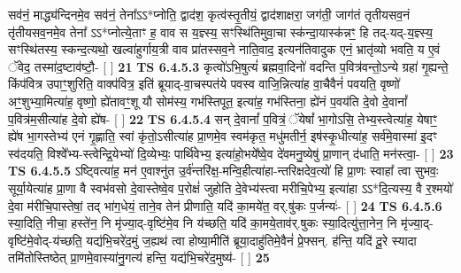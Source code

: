 \documentclass[17pt]{extarticle}
\begin{document}
                  सव॑नं॒ माद्ध्य॑न्दिनमे॒व सव॑नं॒ तेना᳚ऽऽ*प्नोति॒ द्वाद॑श॒ कृत्व॑स्तृ॒तीयं॒ द्वाद॑शाक्षरा॒ जग॑ती॒ जाग॑तं तृतीयसव॒नं तृ॑तीयसव॒नमे॒व तेना᳚ ऽऽ*प्नोत्ये॒ताꣳ ह॒ वाव स य॒ज्ञ्स्य॒ सꣳस्थि॑तिमुवा॒चा स्क॑न्दा॒यास्क॑न्नꣳ॒॒ हि तद्-यद्-य॒ज्ञ्स्य॒ सꣳस्थि॑तस्य॒ स्कन्द॒त्यथो॒ खल्वा॑हुर्गाय॒त्री वाव प्रा॑तस्सव॒ने नाति॒वाद॒ इत्यन॑तिवादुक एनं॒ भ्रातृ॑व्यो भवति॒ य ए॒वं ॅवेद॒ तस्मा॑द॒ष्टाव॑ष्टौ॒- [  ] \textbf{  21} \newline
                  \newline
                                \textbf{ TS 6.4.5.3} \newline
                  कृत्वो॑ऽभि॒षुत्यं॑ ब्रह्मवा॒दिनो॑ वदन्ति प॒वित्र॑वन्तो॒ऽन्ये ग्रहा॑ गृ॒ह्यन्ते॒ किंप॑वित्र उपाꣳ॒॒शुरिति॒ वाक्प॑वित्र॒ इति॑ ब्रूयाद्-वा॒चस्पत॑ये पवस्व वाजि॒न्नित्या॑ह वा॒चैवैनं॑ पवयति॒ वृष्णो॑ अꣳ॒॒शुभ्या॒मित्या॑ह॒ वृष्णो॒ ह्ये॑तावꣳ॒॒शू यौ सोम॑स्य॒ गभ॑स्तिपूत॒ इत्या॑ह॒ गभ॑स्तिना॒ ह्ये॑नं प॒वय॑ति दे॒वो दे॒वानां᳚ प॒वित्र॑म॒सीत्या॑ह दे॒वो ह्ये॑ष- [  ] \textbf{  22} \newline
                  \newline
                                \textbf{ TS 6.4.5.4} \newline
                  सन् दे॒वानां᳚ प॒वित्रं॒ ॅयेषां᳚ भा॒गोऽसि॒ तेभ्य॒स्त्वेत्या॑ह॒ येषाꣳ॒॒ ह्ये॑ष भा॒गस्तेभ्य॑ एनं गृ॒ह्णाति॒ स्वां कृ॑तो॒ऽसीत्या॑ह प्रा॒णमे॒व स्वम॑कृत॒ मधु॑मतीर्न॒ इष॑स्कृ॒धीत्या॑ह॒ सर्व॑मे॒वास्मा॑ इ॒दꣳ स्व॑दयति॒ विश्वे᳚भ्य-स्त्वेन्द्रि॒येभ्यो॑ दि॒व्येभ्यः॒ पार्थि॑वेभ्य॒ इत्या॑हो॒भये᳚ष्वे॒व दे॑वमनु॒ष्येषु॑ प्रा॒णान् द॑धाति॒ मन॑स्त्वा॒- [  ] \textbf{  23} \newline
                  \newline
                                \textbf{ TS 6.4.5.5} \newline
                  ऽष्ट्वित्या॑ह॒ मन॑ ए॒वाश्नु॑त उ॒र्व॑न्तरि॑क्ष॒-मन्वि॒हीत्या॑हा-न्तरिक्षदेव॒त्यो॑ हि प्रा॒णः स्वाहा᳚ त्वा सुभवः॒ सूर्या॒येत्या॑ह प्रा॒णा वै स्वभ॑वसो दे॒वास्तेष्वे॒व प॒रोक्षं॑ जुहोति दे॒वेभ्य॑स्त्वा मरीचि॒पेभ्य॒ इत्या॑हा ऽऽ*दि॒त्यस्य॒ वै र॒श्मयो॑ दे॒वा म॑रीचि॒पास्तेषां॒ तद् भा॑ग॒धेयं॒ ताने॒व तेन॑ प्रीणाति॒ यदि॑ का॒मये॑त॒ वर्.षु॑कः प॒र्जन्यः॑- [  ] \textbf{  24} \newline
                  \newline
                                \textbf{ TS 6.4.5.6} \newline
                  स्या॒दिति॒ नीचा॒ हस्ते॑न॒ नि मृ॑ज्या॒द्-वृष्टि॑मे॒व नि य॑च्छति॒ यदि॑ का॒मये॒ताव॑र्.षुकः स्या॒दित्यु॑त्ता॒नेन॒ नि मृ॑ज्या॒द्-वृष्टि॑मे॒वोद्-य॑च्छति॒ यद्य॑भि॒चरे॑द॒मुं ज॒ह्यथ॑ त्वा होष्या॒मीति॑ ब्रूया॒दाहु॑तिमे॒वैनं॑ प्रे॒फ्सन्. ह॑न्ति॒ यदि॑ दू॒रे स्यादा तमि॑तोस्तिष्ठेत् प्रा॒णमे॒वास्या॑नु॒गत्य॑ हन्ति॒ यद्य॑भि॒चरे॑द॒मुष्य॑- [  ] \textbf{  25} \newline
\end{document}
